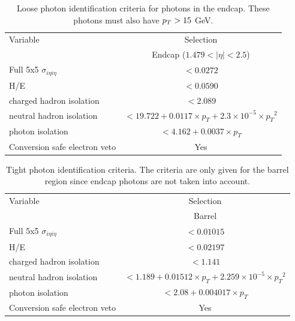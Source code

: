 \begin{table}[htb!]
    \centering
    \small
    \def\arraystretch{1.2}
    \begin{tabular}{l c}
    \hline
    Variable                                   &  Selection       \\
                                               &  Endcap ($1.479<|\eta|<2.5$)  \\
    \hline
    \hline
    Full 5x5 $\sigma_{i\eta i\eta}$            & $< 0.0272 $    \\
    H/E                                        & $< 0.0590 $    \\
    charged hadron isolation                   & $< 2.089 $     \\
    neutral hadron isolation                   & $< 19.722 + 0.0117\times p_T+2.3\times 10^{-5} \times {p_T}^2$ \\
    photon isolation                           & $< 4.162 + 0.0037\times p_T$  \\
    Conversion safe electron veto              & Yes           \\
    \hline
    \end{tabular}
    \caption{Loose photon identification criteria for photons in the endcap. These photons must also have $p_T > 15$ GeV.}
    \label{tab:PhotonIDLooseEndcap}
\end{table}

\begin{table}[htb!]
    \centering
    \small
    \def\arraystretch{1.2}
    \begin{tabular}{l c}
    \hline
    Variable                                   &  Selection       \\
                                               &  Barrel  \\
    \hline
    \hline
    Full 5x5 $\sigma_{i\eta i\eta}$            & $<  0.01015  $ \\
    H/E                                        & $<  0.02197  $   \\
    charged hadron isolation                   & $< 1.141  $     \\
    neutral hadron isolation                   & $< 1.189  + 0.01512\times p_T+2.259\times 10^{-5} \times {p_T}^2$ \\
    photon isolation                           & $< 2.08 + 0.004017\times p_T$  \\
    Conversion safe electron veto              & Yes           \\
    \hline
    \end{tabular}
    \caption{Tight photon identification criteria. The criteria are only given for the barrel region since endcap photons are not taken into account.}
    \label{tab:PhotonIDTight}
\end{table}

